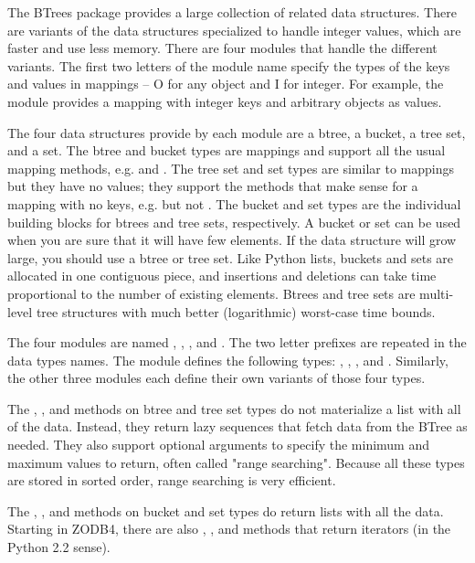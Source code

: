 The BTrees package provides a large collection of related data
structures.  There are variants of the data structures specialized to
handle integer values, which are faster and use less memory.  There
are four modules that handle the different variants.  The first two
letters of the module name specify the types of the keys and values in
mappings -- O for any object and I for integer.  For example, the
 module provides a mapping with integer
keys and arbitrary objects as values.

The four data structures provide by each module are a btree, a bucket,
a tree set, and a set.  The btree and bucket types are mappings and
support all the usual mapping methods, e.g.  and
.  The tree set and set types are similar to mappings
but they have no values; they support the methods that make sense for
a mapping with no keys, e.g.  but not
.  The bucket and set types are the individual
building blocks for btrees and tree sets, respectively.  A bucket or
set can be used when you are sure that it will have few elements.  If
the data structure will grow large, you should use a btree or tree
set.  Like Python lists, buckets and sets are allocated in one
contiguous piece, and insertions and deletions can take time
proportional to the number of existing elements.  Btrees and tree sets
are multi-level tree structures with much better (logarithmic) worst-case
time bounds.

The four modules are named , ,
, and .  The two letter prefixes are
repeated in the data types names.  The  module
defines the following types: , ,
, and .  Similarly, the other three modules
each define their own variants of those four types.

The , , and 
methods on btree and tree set types do not materialize a list with all
of the data.  Instead, they return lazy sequences that fetch data
from the BTree as needed.  They also support optional arguments to
specify the minimum and maximum values to return, often called "range
searching".  Because all these types are stored in sorted order, range
searching is very efficient.

The , , and 
methods on bucket and set types do return lists with all the data.
Starting in ZODB4, there are also ,
, and  methods that
return iterators (in the Python 2.2 sense).

